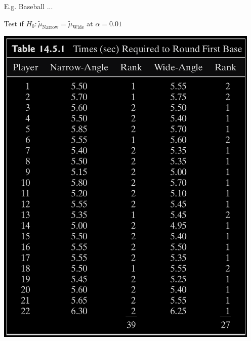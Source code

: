 \begin{frame}[fragile]
\begin{itemize}
	\item[E.g.] Baseball ...
	\begin{center}
	Test if $H_0:\widetilde{\mu}_{\text{Narrow}} = \widetilde{\mu}_{\text{Wide}}$	at $\alpha=0.01$
	\bigskip

	\includegraphics[scale=0.18]{Codes/Table14-5-1.png}
	\end{center}
\end{itemize}
\end{frame}
